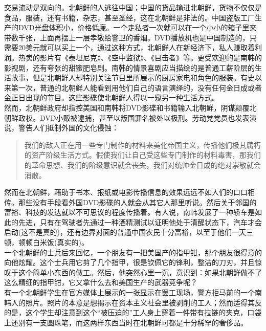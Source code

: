 交易流动是双向的。北朝鲜的人逃往中国；中国的货品输进北朝鲜，货物不仅仅是食品，服装，还有书籍，杂志，甚至圣经，这在北朝鲜是非法的。中国盗版工厂生产的DVD光盘体积小，价格低廉。一个走私者一次就可以在一个小小的箱子里夹带数千张，上面再摆上一层孝敬给警卫的香烟。DVD播放机也是中国制造的，只需要20美元就可以买上一个，通过这种方式，北朝鲜人在新经济下，私人赚取着利润。热卖的影片有《泰坦尼克》、《空中监狱》、《目击者》等。更受欢迎的是南韩的影视剧，还有夸张的甜蜜肥皂剧。南韩的情景喜剧应当描绘的是普通工薪阶层的生活故事，但是北朝鲜人却特别关注节目里所展示的厨房家电和角色的服装。有史以来第一次，普通的北朝鲜人能看到用他们自己的语言演绎的，没有任何金日成或者金正日出现的节目。这些影碟使北朝鲜人得以一窥另一种生活方式。\\

然而，北朝鲜政府却指控美国和南韩将DVD影碟和书籍输入北朝鲜，阴谋颠覆北朝鲜政权。DVD小贩被逮捕，甚至以叛国罪名被处以极刑。劳动党党员也发表演说，警告人们抵制外国的文化侵蚀：\\

\begin{quote}
我们的敌人正在用一些专门制作的材料来美化帝国主义，传播他们极其腐朽的资产阶级生活方式。假使我们让自己受这些专门制作的材料毒害，那我们的革命思想、我们的阶级意识就会丧失，我们对统帅金日成的绝对崇敬就会消散。\\
\end{quote}

然而在北朝鲜，藉助于书本、报纸或电影传播信息的效果远远不如人们的口口相传。那些没有手段看外国DVD影碟的人就会从其它人那里听说。然后关于邻国的富裕、科技的发达就以不可思议的程度传播着。有人说，南韩发展了一种轿车是如此的先进，只有在驾驶者先通过一种酒精测试以证明他处于清醒状态下，汽车才会启动(这不是真的)，还有边界对面的普通中国农民十分富裕，以至于他们一天三顿，顿顿白米饭(真实的)。\\

一个北朝鲜的士兵后来回忆，一个朋友有一把美国产的指甲钳，那个朋友很得意的向他炫耀。这个士兵用它剪了几个指甲，很是钦佩它的锋利，整洁的刀刃，并且惊叹于这个简单小东西的做工。然后，他突然心里一沉，意识到：如果北朝鲜做不了这么精细的指甲钳，它又拿什么去和美国生产的武器竞争呢？\\

有一个北朝鲜学生在官方媒体上展示的一张显示在罢工现场，警方拒马前的一个南韩人的照片。照片的本意是想揭示在资本主义社会里被剥削的工人；然而适得其反的是，这个学生却注意到这个“被压迫的”工人身上穿着一件带有拉链的夹克，口袋上还别有一支圆珠笔，而这两样东西当时在北朝鲜可都是十分稀罕的奢侈品。\\

